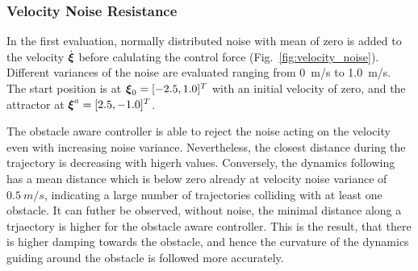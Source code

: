 \subsubsection{Velocity Noise Resistance}
In the first evaluation, normally distributed noise with mean of zero is added to the velocity $\dot{\boldsymbol{ \xi}}$ before calulating the control force (Fig.~\ref{fig:velocity_noise}). Different variances of the noise are evaluated ranging from \qty{0}{m/s} to \qty{1.0}{m/s}. The start position is at $\boldsymbol{\xi}_0 = [-2.5, 1.0]^T$ with an initial velocity of zero, and  the attractor at $\boldsymbol{\xi}^a = [2.5, -1.0]^T$.

The obstacle aware controller is able to reject the noise acting on the velocity even with increasing noise variance. Nevertheless, the closest distance during the trajectory is decreasing with higerh values.
Conversely, the dynamics following has a mean distance which is below zero already at velocity noise variance of $\qty{0.5}{m/s}$, indicating a large number of trajectories colliding with at least one obstacle. 
It can futher be observed, without noise, the minimal distance along a trjaectory is higher for the obstacle aware controller. This is the result, that there is higher damping towards the obstacle, and hence the curvature of the dynamics guiding around the obstacle is followed more accurately.

